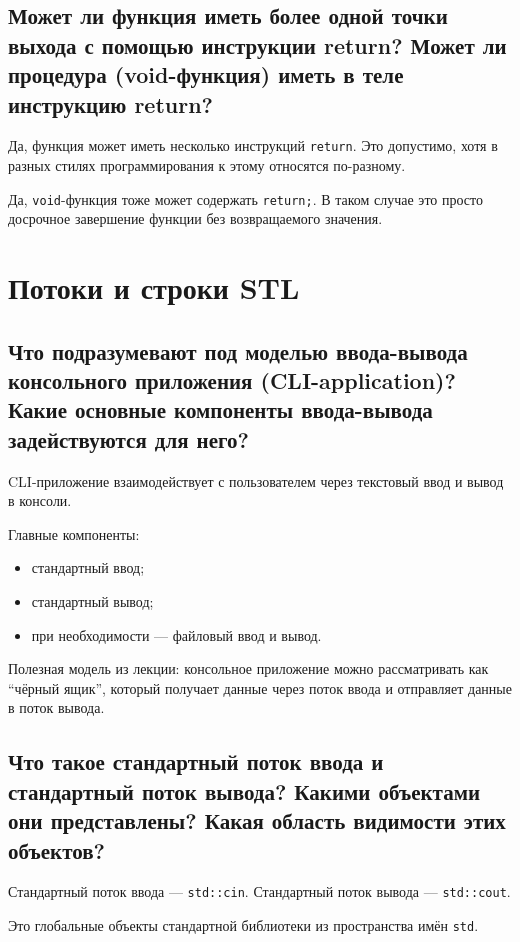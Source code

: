 \subsection{Может ли функция иметь более одной точки выхода с помощью инструкции return? Может ли процедура (void-функция) иметь в теле инструкцию return?}

Да, функция может иметь несколько инструкций \texttt{return}. Это допустимо, хотя в разных стилях программирования к этому относятся по-разному.

Да, \texttt{void}-функция тоже может содержать \texttt{return;}. В таком случае это просто досрочное завершение функции без возвращаемого значения.



\section{Потоки и строки STL}

\subsection{Что подразумевают под моделью ввода-вывода консольного приложения (CLI-application)? Какие основные компоненты ввода-вывода задействуются для него?}

CLI-приложение взаимодействует с пользователем через текстовый ввод и вывод в консоли.

Главные компоненты:
\begin{itemize}
    \item стандартный ввод;
    \item стандартный вывод;
    \item при необходимости --- файловый ввод и вывод.
\end{itemize}

Полезная модель из лекции: консольное приложение можно рассматривать как ``чёрный ящик'', который получает данные через поток ввода и отправляет данные в поток вывода.


\subsection{Что такое стандартный поток ввода и стандартный поток вывода? Какими объектами они представлены? Какая область видимости этих объектов?}

Стандартный поток ввода --- \texttt{std::cin}.  
Стандартный поток вывода --- \texttt{std::cout}.

Это глобальные объекты стандартной библиотеки из пространства имён \texttt{std}.


